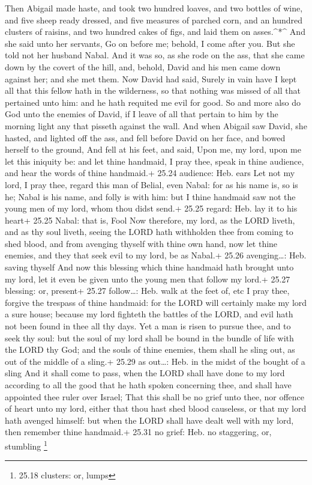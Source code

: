  Then Abigail made haste, and took two hundred loaves, and
two bottles of wine, and five sheep ready dressed, and five measures of
parched corn, and an hundred clusters of raisins, and two hundred cakes
of figs, and laid them on asses.\^{}*\^{}  And she said
unto her servants, Go on before me; behold, I come after you. But she
told not her husband Nabal.  And it was so, as she rode on
the ass, that she came down by the covert of the hill, and, behold,
David and his men came down against her; and she met them. 
Now David had said, Surely in vain have I kept all that this fellow hath
in the wilderness, so that nothing was missed of all that pertained unto
him: and he hath requited me evil for good.  So and more
also do God unto the enemies of David, if I leave of all that pertain to
him by the morning light any that pisseth against the wall.
 And when Abigail saw David, she hasted, and lighted off
the ass, and fell before David on her face, and bowed herself to the
ground,  And fell at his feet, and said, Upon me, my lord,
upon me let this iniquity be: and let thine handmaid, I pray thee, speak
in thine audience, and hear the words of thine handmaid.+ 25.24
audience: Heb. ears  Let not my lord, I pray thee, regard
this man of Belial, even Nabal: for as his name is, so is he; Nabal is
his name, and folly is with him: but I thine handmaid saw not the young
men of my lord, whom thou didst send.+ 25.25 regard: Heb. lay it to his
heart+ 25.25 Nabal: that is, Fool  Now therefore, my lord,
as the LORD liveth, and as thy soul liveth, seeing the LORD hath
withholden thee from coming to shed blood, and from avenging thyself
with thine own hand, now let thine enemies, and they that seek evil to
my lord, be as Nabal.+ 25.26 avenging\ldots: Heb. saving thyself
 And now this blessing which thine handmaid hath brought
unto my lord, let it even be given unto the young men that follow my
lord.+ 25.27 blessing: or, present+ 25.27 follow\ldots: Heb. walk at the
feet of, etc  I pray thee, forgive the trespass of thine
handmaid: for the LORD will certainly make my lord a sure house; because
my lord fighteth the battles of the LORD, and evil hath not been found
in thee all thy days.  Yet a man is risen to pursue thee,
and to seek thy soul: but the soul of my lord shall be bound in the
bundle of life with the LORD thy God; and the souls of thine enemies,
them shall he sling out, as out of the middle of a sling.+ 25.29 as
out\ldots: Heb. in the midst of the bought of a sling  And
it shall come to pass, when the LORD shall have done to my lord
according to all the good that he hath spoken concerning thee, and shall
have appointed thee ruler over Israel;  That this shall be
no grief unto thee, nor offence of heart unto my lord, either that thou
hast shed blood causeless, or that my lord hath avenged himself: but
when the LORD shall have dealt well with my lord, then remember thine
handmaid.+ 25.31 no grief: Heb. no staggering, or, stumbling \footnote{25.18
  clusters: or, lumps}

